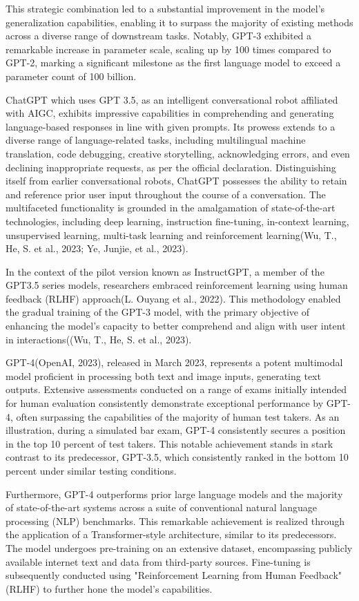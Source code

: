 \documentclass[fleqn,10pt]{thescipub} %
\begin{document}
This strategic combination led to a substantial improvement in the model's generalization capabilities, enabling it to surpass the majority of existing methods across a diverse range of downstream tasks. Notably, GPT-3 exhibited a remarkable increase in parameter scale, scaling up by 100 times compared to GPT-2, marking a significant milestone as the first language model to exceed a parameter count of 100 billion.

ChatGPT which uses GPT 3.5, as an intelligent conversational robot affiliated with AIGC, exhibits impressive capabilities in comprehending and generating language-based responses in line with given prompts. Its prowess extends to a diverse range of language-related tasks, including multilingual machine translation, code debugging, creative storytelling, acknowledging errors, and even declining inappropriate requests, as per the official declaration. Distinguishing itself from earlier conversational robots, ChatGPT possesses the ability to retain and reference prior user input throughout the course of a conversation. The multifaceted functionality is grounded in the amalgamation of state-of-the-art technologies, including deep learning, instruction fine-tuning, in-context learning, unsupervised learning, multi-task learning and reinforcement learning(Wu, T., He, S. et al., 2023; Ye, Junjie, et al., 2023).

In the context of the pilot version known as InstructGPT, a member of the GPT3.5 series models, researchers embraced reinforcement learning using human feedback (RLHF) approach(L. Ouyang et al., 2022). This methodology enabled the gradual training of the GPT-3 model, with the primary objective of enhancing the model's capacity to better comprehend and align with user intent in interactions((Wu, T., He, S. et al., 2023).

GPT-4(OpenAI, 2023), released in March 2023, represents a potent multimodal model proficient in processing both text and image inputs, generating text outputs. Extensive assessments conducted on a range of exams initially intended for human evaluation consistently demonstrate exceptional performance by GPT-4, often surpassing the capabilities of the majority of human test takers. As an illustration, during a simulated bar exam, GPT-4 consistently secures a position in the top 10 percent of test takers. This notable achievement stands in stark contrast to its predecessor, GPT-3.5, which consistently ranked in the bottom 10 percent under similar testing conditions.

Furthermore, GPT-4 outperforms prior large language models and the majority of state-of-the-art systems across a suite of conventional natural language processing (NLP) benchmarks. This remarkable achievement is realized through the application of a Transformer-style architecture, similar to its predecessors. The model undergoes pre-training on an extensive dataset, encompassing publicly available internet text and data from third-party sources. Fine-tuning is subsequently conducted using "Reinforcement Learning from Human Feedback" (RLHF) to further hone the model's capabilities.
\end{document}
